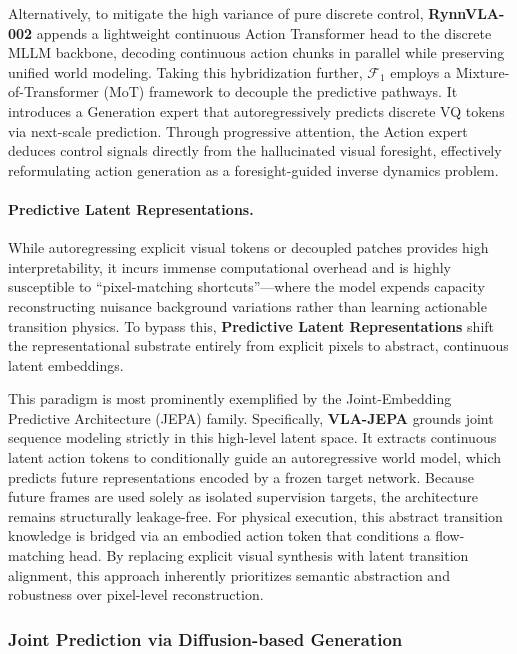 Alternatively, to mitigate the high variance of pure discrete control, \textbf{RynnVLA-002} \cite{rynnvla2} appends a lightweight continuous Action Transformer head to the discrete MLLM backbone, decoding continuous action chunks in parallel while preserving unified world modeling. Taking this hybridization further, $\mathcal{F}_{1}$ \cite{f1vla} employs a Mixture-of-Transformer (MoT) framework to decouple the predictive pathways. It introduces a Generation expert that autoregressively predicts discrete VQ tokens via next-scale prediction. Through progressive attention, the Action expert deduces control signals directly from the hallucinated visual foresight, effectively reformulating action generation as a foresight-guided inverse dynamics problem.



\paragraph{\textbf{Predictive Latent Representations.}} 

While autoregressing explicit visual tokens or decoupled patches provides high interpretability, it incurs immense computational overhead and is highly susceptible to ``pixel-matching shortcuts''—where the model expends capacity reconstructing nuisance background variations rather than learning actionable transition physics. To bypass this, \textbf{Predictive Latent Representations} shift the representational substrate entirely from explicit pixels to abstract, continuous latent embeddings. 

This paradigm is most prominently exemplified by the Joint-Embedding Predictive Architecture (JEPA) family. Specifically, \textbf{VLA-JEPA} \cite{VLA-JEPA} grounds joint sequence modeling strictly in this high-level latent space. It extracts continuous latent action tokens to conditionally guide an autoregressive world model, which predicts future representations encoded by a frozen target network. Because future frames are used solely as isolated supervision targets, the architecture remains structurally leakage-free. For physical execution, this abstract transition knowledge is bridged via an embodied action token that conditions a flow-matching head. By replacing explicit visual synthesis with latent transition alignment, this approach inherently prioritizes semantic abstraction and robustness over pixel-level reconstruction.




\subsubsection{Joint Prediction via Diffusion-based Generation}
\label{sec:joint_continuous}


